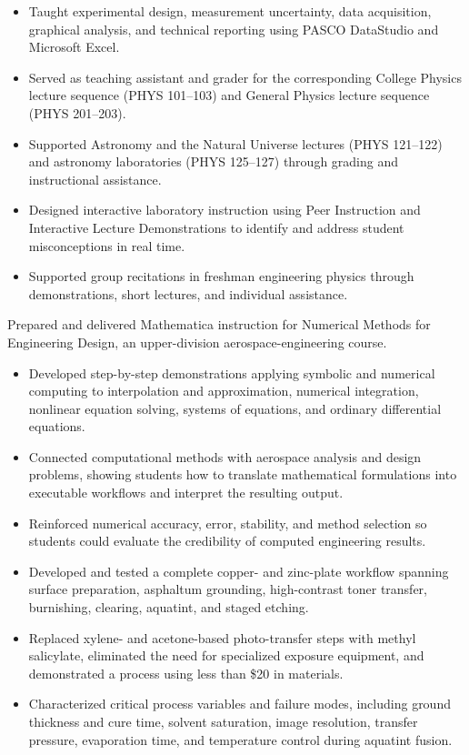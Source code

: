 \begin{itemize}
  \item Taught experimental design, measurement uncertainty, data acquisition, graphical analysis, and technical reporting using PASCO DataStudio and Microsoft Excel.
  \item Served as teaching assistant and grader for the corresponding College Physics lecture sequence (PHYS 101--103) and General Physics lecture sequence (PHYS 201--203).
  \item Supported Astronomy and the Natural Universe lectures (PHYS 121--122) and astronomy laboratories (PHYS 125--127) through grading and instructional assistance.
  \item Designed interactive laboratory instruction using Peer Instruction and Interactive Lecture Demonstrations to identify and address student misconceptions in real time.
  \item Supported group recitations in freshman engineering physics through demonstrations, short lectures, and individual assistance.
\end{itemize}
Prepared and delivered Mathematica instruction for Numerical Methods for Engineering Design, an upper-division aerospace-engineering course.
\begin{itemize}
  \item Developed step-by-step demonstrations applying symbolic and numerical computing to interpolation and approximation, numerical integration, nonlinear equation solving, systems of equations, and ordinary differential equations.
  \item Connected computational methods with aerospace analysis and design problems, showing students how to translate mathematical formulations into executable workflows and interpret the resulting output.
  \item Reinforced numerical accuracy, error, stability, and method selection so students could evaluate the credibility of computed engineering results.
\end{itemize}
\begin{itemize}
  \item Developed and tested a complete copper- and zinc-plate workflow spanning surface preparation, asphaltum grounding, high-contrast toner transfer, burnishing, clearing, aquatint, and staged etching.
  \item Replaced xylene- and acetone-based photo-transfer steps with methyl salicylate, eliminated the need for specialized exposure equipment, and demonstrated a process using less than \$20 in materials.
  \item Characterized critical process variables and failure modes, including ground thickness and cure time, solvent saturation, image resolution, transfer pressure, evaporation time, and temperature control during aquatint fusion.
\end{itemize}
